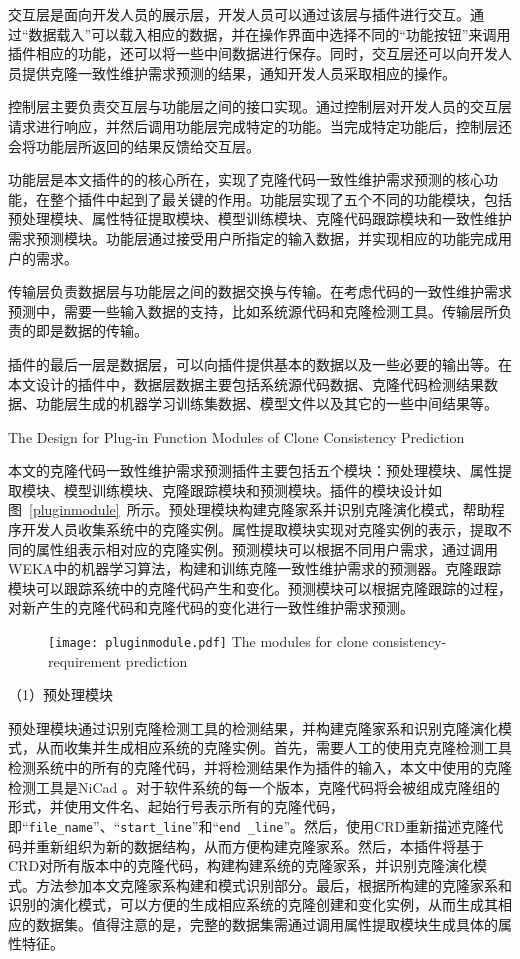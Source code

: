 交互层是面向开发人员的展示层，开发人员可以通过该层与插件进行交互。通过“数据载入”可以载入相应的数据，并在操作界面中选择不同的“功能按钮”来调用插件相应的功能，还可以将一些中间数据进行保存。同时，交互层还可以向开发人员提供克隆一致性维护需求预测的结果，通知开发人员采取相应的操作。

控制层主要负责交互层与功能层之间的接口实现。通过控制层对开发人员的交互层请求进行响应，并然后调用功能层完成特定的功能。当完成特定功能后，控制层还会将功能层所返回的结果反馈给交互层。

功能层是本文插件的的核心所在，实现了克隆代码一致性维护需求预测的核心功能，在整个插件中起到了最关键的作用。功能层实现了五个不同的功能模块，包括预处理模块、属性特征提取模块、模型训练模块、克隆代码跟踪模块和一致性维护需求预测模块。功能层通过接受用户所指定的输入数据，并实现相应的功能完成用户的需求。

传输层负责数据层与功能层之间的数据交换与传输。在考虑代码的一致性维护需求预测中，需要一些输入数据的支持，比如系统源代码和克隆检测工具。传输层所负责的即是数据的传输。

插件的最后一层是数据层，可以向插件提供基本的数据以及一些必要的输出等。在本文设计的插件中，数据层数据主要包括系统源代码数据、克隆代码检测结果数据、功能层生成的机器学习训练集数据、模型文件以及其它的一些中间结果等。

{The Design for Plug-in Function Modules of Clone Consistency Prediction}

本文的克隆代码一致性维护需求预测插件主要包括五个模块：预处理模块、属性提取模块、模型训练模块、克隆跟踪模块和预测模块。插件的模块设计如图~\ref{pluginmodule}~所示。预处理模块构建克隆家系并识别克隆演化模式，帮助程序开发人员收集系统中的克隆实例。属性提取模块实现对克隆实例的表示，提取不同的属性组表示相对应的克隆实例。预测模块可以根据不同用户需求，通过调用WEKA中的机器学习算法，构建和训练克隆一致性维护需求的预测器。克隆跟踪模块可以跟踪系统中的克隆代码产生和变化。预测模块可以根据克隆跟踪的过程，对新产生的克隆代码和克隆代码的变化进行一致性维护需求预测。

\begin{figure}[h]
\centering
\texttt{[image: pluginmodule.pdf]}
{The modules for clone consistency-requirement prediction}
\vspace{-1em}
\end{figure}

（1）预处理模块

预处理模块通过识别克隆检测工具的检测结果，并构建克隆家系和识别克隆演化模式，从而收集并生成相应系统的克隆实例。首先，需要人工的使用克克隆检测工具检测系统中的所有的克隆代码，并将检测结果作为插件的输入，本文中使用的克隆检测工具是NiCad 。对于软件系统的每一个版本，克隆代码将会被组成克隆组的形式，并使用文件名、起始行号表示所有的克隆代码，即“{\tt file\_name}”、“{\tt start\_line}”和“{\tt end \_line}”。然后，使用CRD重新描述克隆代码并重新组织为新的数据结构，从而方便构建克隆家系。然后，本插件将基于CRD对所有版本中的克隆代码，构建构建系统的克隆家系，并识别克隆演化模式。方法参加本文克隆家系构建和模式识别部分。最后，根据所构建的克隆家系和识别的演化模式，可以方便的生成相应系统的克隆创建和变化实例，从而生成其相应的数据集。值得注意的是，完整的数据集需通过调用属性提取模块生成具体的属性特征。


